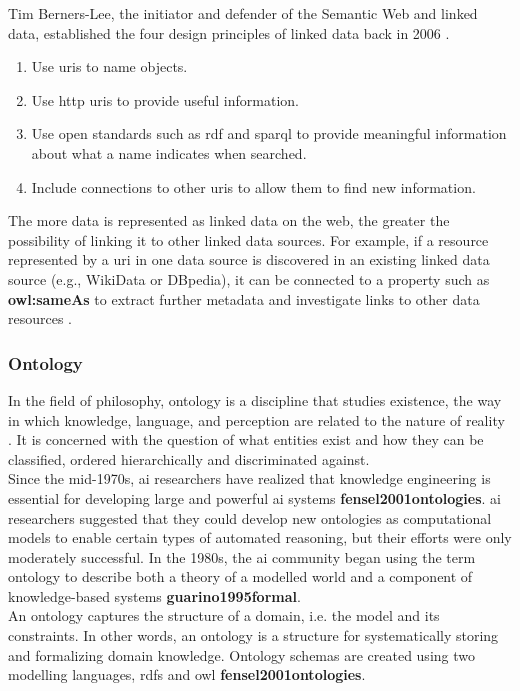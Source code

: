     Tim Berners-Lee, the initiator and defender of the Semantic Web and linked data, established the four design principles of linked data back in 2006 \cite{bizer2008linked, bizer2011linked}.
    \begin{enumerate}
        \item Use \acrshort{uri}s to name objects.
        \item Use \acrshort{http} \acrshort{uri}s to provide useful information. 
        \item Use open standards such as \acrshort{rdf} and \acrshort{sparql} to provide meaningful information about what a name indicates when searched. 
        \item Include connections to other \acrshort{uri}s to allow them to find new information. 
    \end{enumerate}

    The more data is represented as linked data on the web, the greater the possibility of linking it to other linked data sources. For example, if a resource represented by a \acrshort{uri} in one data source is discovered in an existing linked data source (e.g., WikiData or DBpedia), it can be connected to a property such as \textbf{owl:sameAs} to extract further metadata and investigate links to other data resources \cite{bizer2008linked}.\\

    \subsubsection{Ontology}
    In the field of philosophy, ontology is a discipline that studies existence, the way in which knowledge, language, and perception are related to the nature of reality \cite{smith2012ontology}. It is concerned with the question of what entities exist and how they can be classified, ordered hierarchically and discriminated against. \\
    Since the mid-1970s, \acrshort{ai} researchers have realized that knowledge engineering is essential for developing large and powerful \acrshort{ai} systems \textbf{fensel2001ontologies}. \acrshort{ai} researchers suggested that they could develop new ontologies as computational models to enable certain types of automated reasoning, but their efforts were only moderately successful. In the 1980s, the \acrshort{ai} community began using the term ontology to describe both a theory of a modelled world and a component of knowledge-based systems \textbf{guarino1995formal}.\\
    An ontology captures the structure of a domain, i.e. the model and its constraints. In other words, an ontology is a structure for systematically storing and formalizing domain knowledge. Ontology schemas are created using two modelling languages, \acrfull{rdfs} and \acrfull{owl} \textbf{fensel2001ontologies}.\\

